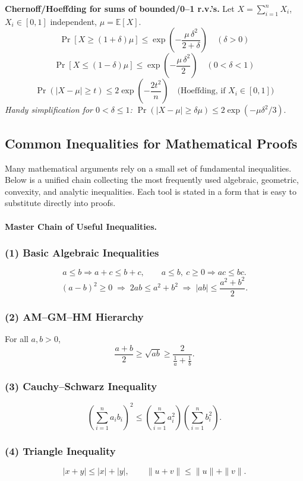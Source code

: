 \documentclass[10pt]{article}
\theoremstyle{definition}
\begin{document}
\noindent\textbf{Chernoff/Hoeffding for sums of bounded/0--1 r.v.'s.} Let $X=\sum_{i=1}^n X_i$, $X_i\in[0,1]$ independent, $\mu=\mathbb{E}[X]$.
\[
\Pr\!\left[X\ge (1+\delta)\mu\right]\le \exp\!\left(-\frac{\mu\,\delta^2}{2+\delta}\right)\quad(\delta>0)
\]
\[
\Pr\!\left[X\le (1-\delta)\mu\right]\le \exp\!\left(-\frac{\mu\,\delta^2}{2}\right)\quad(0<\delta<1)
\]
\[
\Pr(|X-\mu|\ge t)\le 2\exp\!\left(-\frac{2t^2}{n}\right)\quad\text{(Hoeffding, if $X_i\in[0,1]$)}
\]
\emph{Handy simplification for $0<\delta\le1$: } $\Pr(|X-\mu|\ge \delta\mu)\le 2\exp(-\mu\delta^2/3)$.
\subsection{Common Inequalities for Mathematical Proofs}
Many mathematical arguments rely on a small set of fundamental inequalities.
Below is a unified chain collecting the most frequently used algebraic,
geometric, convexity, and analytic inequalities.  Each tool is stated in a form
that is easy to substitute directly into proofs.
\paragraph{Master Chain of Useful Inequalities.}

\subsubsection*{(1) Basic Algebraic Inequalities}
\[
a \le b \Rightarrow a+c \le b+c,
\qquad
a \le b,\ c \ge 0 \Rightarrow ac \le bc.
\]
\[
(a-b)^2 \ge 0
\;\Rightarrow\;
2ab \le a^2 + b^2
\;\Rightarrow\;
|ab| \le \frac{a^2 + b^2}{2}.
\]

\subsubsection*{(2) AM--GM--HM Hierarchy}
For all \(a,b>0\),
\[
\frac{a+b}{2} \ge \sqrt{ab} \ge \frac{2}{\tfrac{1}{a}+\tfrac{1}{b}}.
\]

\subsubsection*{(3) Cauchy--Schwarz Inequality}
\[
\left(\sum_{i=1}^n a_i b_i\right)^2
\le
\left(\sum_{i=1}^n a_i^2\right)
\left(\sum_{i=1}^n b_i^2\right).
\]

\subsubsection*{(4) Triangle Inequality}
\[
|x+y|\le |x|+|y|,
\qquad
\|u+v\| \le \|u\| + \|v\|.
\]
\end{document}
